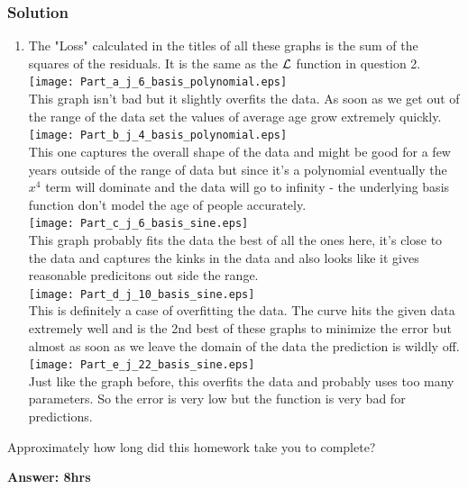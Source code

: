 \documentclass[submit]{harvardml}
\begin{document}
	\subsubsection*{Solution}
	\begin{enumerate}
		\item The "Loss" calculated in the titles of all these graphs is the sum of the squares of the residuals.  It is the same as the $\mathcal{L}$ function in question 2.  \\
		\texttt{[image: Part\_a\_j\_6\_basis\_polynomial.eps]} \\
		This graph isn't bad but it slightly overfits the data.  As soon as we get out of the range of the data set the values of average age grow extremely quickly.  \\ 
		\texttt{[image: Part\_b\_j\_4\_basis\_polynomial.eps]} \\
		This one captures the overall shape of the data and might be good for a few years outside of the range of data but since it's a polynomial eventually the $x^4$ term will dominate and the data will go to infinity - the underlying basis function don't model the age of people accurately. \\  
		\texttt{[image: Part\_c\_j\_6\_basis\_sine.eps]} \\
		This graph probably fits the data the best of all the ones here, it's close to the data and captures the kinks in the data and also looks like it gives reasonable predicitons out side the range. \\ 
		\texttt{[image: Part\_d\_j\_10\_basis\_sine.eps]} \\
		This is definitely a case of overfitting the data.  The curve hits the given data extremely well and is the 2nd best of these graphs to minimize the error but almost as soon as we leave the domain of the data the prediction is wildly off.  \\
		\texttt{[image: Part\_e\_j\_22\_basis\_sine.eps]} \\
		Just like the graph before, this overfits the data and probably uses too many parameters.  So the error is very low but the function is very bad for predictions. \\   
		
	\end{enumerate}
	
	
	
	
	
	
	
	
	
	
	\newpage
	\begin{problem}[Calibration, 1pt]
		Approximately how long did this homework take you to complete?
	\end{problem}
	\textbf{Answer: 8hrs}
	
\end{document}
